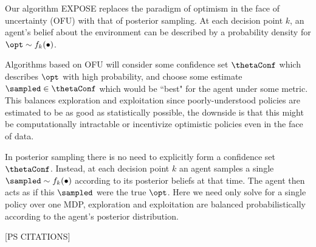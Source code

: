 Our algorithm EXPOSE replaces the paradigm of optimism in the face of uncertainty (OFU) with that of posterior sampling. At each decision point $k$, an agent's belief about the environment can be described by a probability density for $\opt \sim f_k(\bullet)$. 

Algorithms based on OFU will consider some confidence set $\thetaConf$ which describes $\opt$ with high probability, and choose some estimate $\sampled \in \thetaConf$ which would be ``best" for the agent under some metric. This balances exploration and exploitation since poorly-understood policies are estimated to be as good as statistically possible, the downside is that this might be computationally intractable or incentivize optimistic policies even in the face of data.

In posterior sampling there is no need to explicitly form a confidence set $\thetaConf$. Instead, at each decision point $k$ an agent samples a single $\sampled \sim f_k(\bullet)$ according to its posterior beliefs at that time. The agent then acts as if this $\sampled$ were the true $\opt$. Here we need only solve for a single policy over one MDP, exploration and exploitation are balanced probabilistically according to the agent's posterior distribution.


\cite{jaksch2010near}

\cite{Strens2000}

\cite{BartlettTewari}

\cite{FilippiCappeGarivier2011}

[PS CITATIONS]
